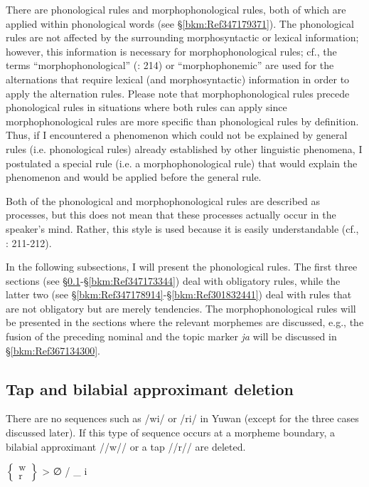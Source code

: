 There are phonological rules and morphophonological rules, both of which are applied within phonological words (see §\ref{bkm:Ref347179371}). The phonological rules are not affected by the surrounding morphosyntactic or lexical information; however, this information is necessary for morphophonological rules; cf., the terms “morphophonological” (\citealt{HaspelmathSims2010}: 214) or “morphophonemic” \citep[23-24]{Payne1997} are used for the alternations that require lexical (and morphosyntactic) information in order to apply the alternation rules. Please note that morphophonological rules precede phonological rules in situations where both rules can apply since morphophonological rules are more specific than phonological rules by definition. Thus, if I encountered a phenomenon which could not be explained by general rules (i.e. phonological rules) already established by other linguistic phenomena, I postulated a special rule (i.e. a morphophonological rule) that would explain the phenomenon and would be applied before the general rule.

  Both of the phonological and morphophonological rules are described as processes, but this does not mean that these processes actually occur in the speaker’s mind. Rather, this style is used because it is easily understandable (cf., \citealt{HaspelmathSims2010}: 211-212).

  In the following subsections, I will present the phonological rules. The first three sections (see §\ref{bkm:Ref304225942}{}-§\ref{bkm:Ref347173344}) deal with obligatory rules, while the latter two (see §\ref{bkm:Ref347178914}{}-§\ref{bkm:Ref301832441}) deal with rules that are not obligatory but are merely tendencies. The morphophonological rules will be presented in the sections where the relevant morphemes are discussed, e.g., the fusion of the preceding nominal and the topic marker \textit{ja} will be discussed in §\ref{bkm:Ref367134300}.

\subsection{Tap and bilabial approximant deletion}
\label{bkm:Ref304225942}\hypertarget{RefHeadingToc395696978}{}\label{bkm:Ref381399452}
There are no sequences such as /wi/ or /ri/ in Yuwan (except for the three cases discussed later). If this type of sequence occurs at a morpheme boundary, a bilabial approximant //w// or a tap //r// are deleted.

\ea $\left\{\begin{array}{c} \text{w}\\\text{r}\end{array}\right\}$ > ∅ / \_ i 

